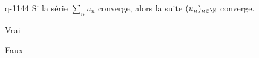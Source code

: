 \begin{truefalse}{q-1144}
Si la série $\sum_n u_n$ converge, alors la suite $(u_n)_{n\in\N}$ converge. 
\item* Vrai
\item Faux
\end{truefalse}

